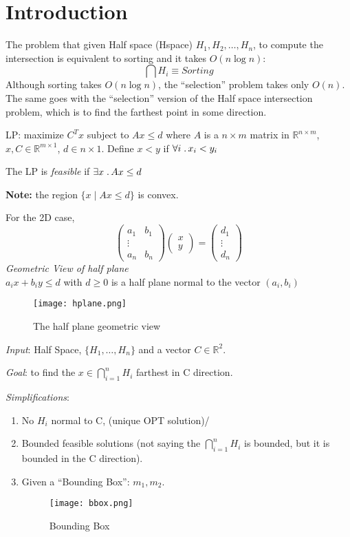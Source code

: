 \documentclass[12pt]{article}
\newcommand{\note}[1]{\par {\bf Note: }{#1}}
\begin{document}
\section{Introduction}
The problem that given Half space (Hspace) $H_1, H_2, \dots, H_n$, to
compute the intersection is equivalent to sorting and it takes $O(n
\log n)$: 
$$\bigcap{H_i} \equiv Sorting$$
Although sorting takes $O(n \log n)$, the ``selection'' problem takes
only $O(n)$. The same goes with the ``selection'' version of the Half
space intersection problem, which is to find the farthest point in
some direction.

\begin{definition}
  LP: maximize $C^T x$ subject to $Ax \leq d$ where $A$ is a
  $n \times m$ matrix in $\mathbb{R}^{n \times m}$,
  $x, C \in \mathbb{R}^ {m \times 1}$, $d \in {n \times 1}$. Define
  $x < y$ if $\forall i \;\ldotp x_i < y_i$
\end{definition}

\begin{definition}
  The LP is \emph{feasible} if $\exists x \;\ldotp Ax \leq d$ \note
  {the region $\{x \mid Ax \leq d\}$ is convex.}
\end{definition}
For the 2D case, 
$$\begin{pmatrix} a_1 & b_1 \\ \vdots \\ a_n & b_n \end{pmatrix}
  \begin{pmatrix} x \\ y \end{pmatrix} = 
  \begin{pmatrix} d_1 \\ \vdots \\ d_n \end{pmatrix}
$$
\emph{Geometric View of half plane}\\
$a_i x + b_i y \leq d$ with $d \geq 0$ is a half plane normal to the
vector $(a_i, b_i)$
\begin{figure}[h!]
  \centering
  \texttt{[image: hplane.png]}
  \caption{The half plane geometric view}
  \label{fig:hplane}
\end{figure}

\emph{Input}: Half Space, $\{H_1, \dots, H_n\}$ and a vector $C \in \mathbb{R}^2$.
\pagebreak

\emph{Goal}: to find the $x \in \bigcap_{i = 1}^n H_i$ farthest in C
direction.

\emph{Simplifications}:
\begin{enumerate}[1)]
\item No $H_i$ normal to C, (unique OPT solution)/
\item Bounded feasible solutions (not saying the $\bigcap_{i = 1}^n
  H_i$ is bounded, but it is bounded in the C direction).
\item Given a ``Bounding Box'': $m_1, m_2$.
  \begin{figure}[h!]
    \centering
    \texttt{[image: bbox.png]}
    \caption{Bounding Box}
    \label{fig:bbox}
  \end{figure}
\end{enumerate}
\end{document}
